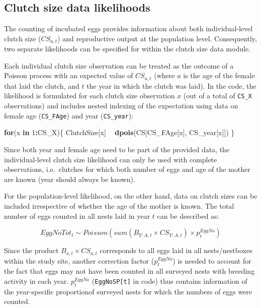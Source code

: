 \documentclass[
]{book}
\newenvironment{Shaded}{\begin{snugshade}}{\end{snugshade}}
\newcommand{\ControlFlowTok}[1]{\textcolor[rgb]{0.13,0.29,0.53}{\textbf{#1}}}
\newcommand{\DecValTok}[1]{\textcolor[rgb]{0.00,0.00,0.81}{#1}}
\newcommand{\KeywordTok}[1]{\textcolor[rgb]{0.13,0.29,0.53}{\textbf{#1}}}
\newcommand{\NormalTok}[1]{#1}
\newcommand{\OperatorTok}[1]{\textcolor[rgb]{0.81,0.36,0.00}{\textbf{#1}}}
\newcommand{\StringTok}[1]{\textcolor[rgb]{0.31,0.60,0.02}{#1}}
\begin{document}
\hypertarget{clutch-size-data-likelihoods}{%
\subsection{Clutch size data likelihoods}\label{clutch-size-data-likelihoods}}

The counting of incubated eggs provides information about both individual-level
clutch size (\(CS_{a,t}\)) and reproductive output at the population level.
Consequently, two separate likelihoods can be specified for within the clutch
size data module.

Each individual clutch size observation can be treated as the outcome of a
Poisson process with an expected value of \(CS_{a,t}\) (where \(a\) is the age of
the female that laid the clutch, and \(t\) the year in which the clutch was laid).
In the code, the likelihood is formulated for each clutch size observation \(x\)
(out of a total of \texttt{CS\_X} observations) and includes nested indexing of the
expectation using data on female age (\texttt{CS\_FAge}) and year (\texttt{CS\_year}):

\begin{Shaded}
\begin{Highlighting}[]
\ControlFlowTok{for}\NormalTok{(x }\ControlFlowTok{in} \DecValTok{1}\OperatorTok{:}\NormalTok{CS_X)\{}
\NormalTok{    ClutchSize[x] }\OperatorTok{~}\StringTok{ }\KeywordTok{dpois}\NormalTok{(CS[CS_FAge[x], CS_year[x]])}
\NormalTok{\}}
\end{Highlighting}
\end{Shaded}

Since both year and female age need to be part of the provided data, the
individual-level clutch size likelihood can only be used with complete
observations, i.e.~clutches for which both number of eggs and age of the mother
are known (year should always be known).

For the population-level likelihood, on the other hand, data on clutch sizes can
be included irrespective of whether the age of the mother is known. The total
number of eggs counted in all nests laid in year \(t\) can be described as:

\begin{equation}
EggNoTot_t \sim Poisson(sum(B_{Y:A,t} \times CS_{Y:A,t}) \times p_t^{EggNo})
\end{equation}

Since the product \(B_{a,t} \times CS_{a,t}\) corresponds to all eggs laid in all nests/nestboxes within the study site, another correction factor (\(p_t^{EggNo}\)) is needed to account for the fact that eggs may not have been counted in all surveyed nests with breeding activity in each year. \(p_t^{EggNo}\) (\texttt{EggNoSP{[}t{]}} in code) thus contains information of the year-specific proportionof surveyed nests for which the numbers of eggs were counted.
\end{document}
